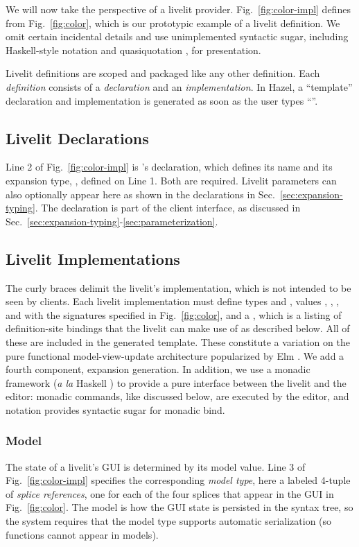 \noindent
We will now take the perspective of a livelit provider.
Fig.~\ref{fig:color-impl}
defines  from Fig.~\ref{fig:color}, 
which is our prototypic example of a livelit 
definition. 
We omit certain  
incidental details and use unimplemented syntactic sugar, including
Haskell-style  notation \cite{marlow2010haskell} and quasiquotation \cite{bawden1999quasiquotation}, for presentation.

Livelit definitions are scoped and packaged like 
any other definition. Each \emph{definition} consists of a \emph{declaration} and an \emph{implementation}. 
In Hazel, a ``template'' declaration and implementation is generated 
as soon as the user types ``''.

\subsection{Livelit Declarations} 
Line 2 of Fig.~\ref{fig:color-impl} is 's declaration,
which defines its name and its {expansion type}, , defined on Line 1. 
Both are required. 
Livelit parameters can also optionally appear here as shown in the declarations in Sec.~\ref{sec:expansion-typing}. 
The declaration is part of the client interface, 
as discussed in Sec.~\ref{sec:expansion-typing}-\ref{sec:parameterization}. 

\subsection{Livelit Implementations}
The curly braces delimit the livelit's implementation, which is not intended to be seen 
by clients. Each livelit implementation must define types  and , 
values , , , and  with the signatures specified in Fig.~\ref{fig:color}, 
and a , which is a listing of definition-site bindings that the livelit can make use of as described below. All of these are included in the generated template.
 These constitute a variation on the pure functional model-view-update
architecture popularized by Elm \cite{ElmArchitecture}. We add a fourth component,
expansion generation. In addition, we use a monadic framework (\emph{a la} Haskell \cite{marlow2010haskell}) to provide a pure   
 interface between the livelit and the editor: monadic commands, like  discussed below, are executed by the editor,
and  notation provides syntactic sugar for monadic bind.


\subsubsection{Model}\label{sec:model}
The state of a livelit's GUI is determined by its model value. 
Line 3 of Fig.~\ref{fig:color-impl} specifies the corresponding \emph{model type},
here a labeled 4-tuple of \emph{splice references}, one for each of the four splices
that appear in the GUI in Fig.~\ref{fig:color}.
The model is how the GUI state is persisted in the syntax tree, so 
 the system requires that the model type supports automatic serialization
 (so functions cannot appear in models).

